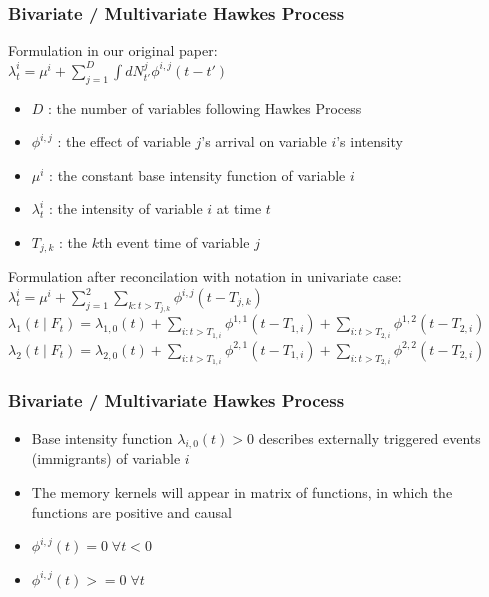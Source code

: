 \documentclass{beamer}
\begin{document}
\begin{frame}
\frametitle{Bivariate / Multivariate Hawkes Process}
Formulation in our original paper:\\
$\lambda_t^i = \mu^i + \sum_{j=1}^D \int dN_{t'}^j \phi^{i,j} (t - t')$\\
\begin{itemize}
	\item $D$ : the number of variables following Hawkes Process
	\item $\phi^{i,j}$ : the effect of variable $j$'s arrival on variable $i$'s intensity
	\item $\mu^i$ : the constant base intensity function of variable $i$
	\item $\lambda_t^i$ : the intensity of variable $i$ at time $t$
	\item $T_{j,k}$ : the $k$th event time of variable $j$
\end{itemize}
Formulation after reconcilation with notation in univariate case:\\
$\lambda_t^i = \mu^i + \sum_{j=1}^2 \sum_{k: t > T_{j,k}} \phi^{i,j}(t - T_{j,k})$\\	
$\lambda_1(t \mid F_t) = \lambda_{1,0}(t) + \sum_{i: t > T_{1,i}} \phi^{1,1}(t - T_{1,i}) + \sum_{i: t > T_{2,i}} \phi^{1,2}(t - T_{2,i})$\\
$\lambda_2(t \mid F_t) = \lambda_{2,0}(t) + \sum_{i: t > T_{1,i}} \phi^{2,1}(t - T_{1,i}) + \sum_{i: t > T_{2,i}} \phi^{2,2}(t - T_{2,i})$
\end{frame}

\begin{frame}
\frametitle{Bivariate / Multivariate Hawkes Process}
\begin{itemize}
	\item Base intensity function $\lambda_{i,0}(t)>0$ describes externally triggered events (immigrants) of variable $i$
	\item The memory kernels will appear in matrix of functions, in which the functions are positive and causal
	\item $\phi^{i,j}(t) = 0 \; \forall t < 0$
	\item $\phi^{i,j}(t) >= 0 \; \forall t$
\end{itemize}
\end{frame}
\end{document}
